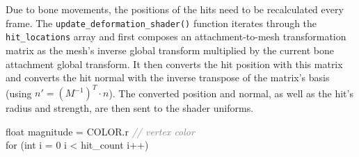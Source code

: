 Due to bone movements, the positions of the hits need to be recalculated every frame. The \texttt{update\_deformation\_shader()} function iterates through the \texttt{hit\_locations} array and first composes an attachment-to-mesh transformation matrix as the mesh's inverse global transform multiplied by the current bone attachment global transform. It then converts the hit position with this matrix and converts the hit normal with the inverse transpose of the matrix's basis (using {$n'=(M^{-1})^T\cdot n$}). The converted position and normal, as well as the hit's radius and strength, are then sent to the shader uniforms.


\begin{algorithm}
\label{alg_DeformationShader}
\caption{Mesh deformation vertex shader.}
float magnitude = COLOR.r \textcolor{gray}{\textit{// vertex color}}\\
for (int i = 0 i < hit\_count i++) \\
\end{algorithm}




